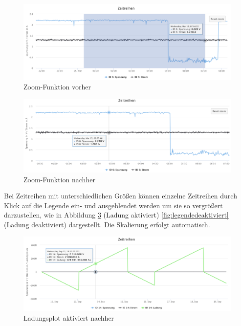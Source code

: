 \begin{figure}
\centering
\includegraphics[width=\textwidth]{Figures/zoomvorher}
\caption{Zoom-Funktion vorher}
\label{fig:zoomvorher}
\end{figure} 

\begin{figure}
\centering
\includegraphics[width=\textwidth]{Figures/zoomnachher}
\caption{Zoom-Funktion nachher}
\label{fig:zoomnachher}
\end{figure} 

Bei Zeitreihen mit unterschiedlichen Größen können einzelne Zeitreihen durch Klick auf die Legende ein- und ausgeblendet werden um sie so vergrößert darzustellen, wie in Abbildung \ref{fig:legendeaktiviert} (Ladung aktiviert) \ref{fig:legendedeaktiviert} (Ladung deaktiviert) dargestellt. Die Skalierung erfolgt automatisch.

\begin{figure}
\centering
\includegraphics[width=\textwidth]{Figures/legendeaktiviert}
\caption{Ladungsplot aktiviert nachher}
\label{fig:legendeaktiviert}
\end{figure} 

